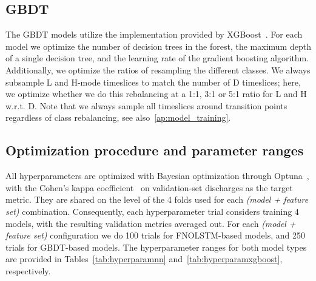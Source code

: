\subsection{GBDT}
The GBDT models utilize the implementation provided by XGBoost~\cite{xgboost2016}. For each model we optimize the number of decision trees in the forest, the maximum depth of a single decision tree, and the learning rate of the gradient boosting algorithm. Additionally, we optimize the ratios of resampling the different classes. We always subsample L and H-mode timeslices to match the number of D timeslices; here, we optimize whether we do this rebalancing at a 1:1, 3:1 or 5:1 ratio for L and H w.r.t. D. Note that we always sample all timeslices around transition points regardless of class rebalancing, see also~\ref{ap:model_training}.

\subsection{Optimization procedure and parameter ranges}
All hyperparameters are optimized with Bayesian optimization through Optuna~\cite{optuna2019}, with the Cohen's kappa coefficient~\cite{cohen1960} on validation-set discharges as the target metric. They are shared on the level of the 4 folds used for each \textit{(model + feature set)} combination. Consequently, each hyperparameter trial considers training 4 models, with the resulting validation metrics averaged out. For each \textit{(model + feature set)} configuration we do 100 trials for FNOLSTM-based models, and 250 trials for GBDT-based models. The hyperparameter ranges for both model types are provided in Tables~\ref{tab:hyperparamnn} and~\ref{tab:hyperparamxgboost}, respectively. 




